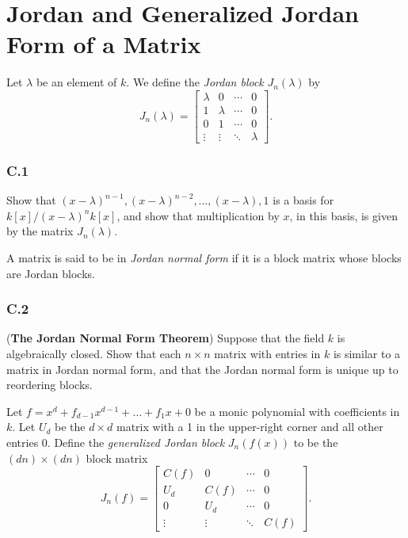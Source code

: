 \documentclass[lang=cn,11pt]{template}
\begin{document}
\chapter{Jordan and Generalized Jordan Form of a Matrix}

\begin{definition}
Let \( \lambda \) be an element of \( k \). We define the \textit{Jordan block} \( J_n(\lambda) \) by
\[
J_n(\lambda) = \begin{bmatrix}
\lambda & 0 & \cdots & 0 \\
1 & \lambda & \cdots & 0 \\
0 & 1 & \cdots & 0 \\
\vdots & \vdots & \ddots & \lambda
\end{bmatrix}.
\]
\end{definition}

\subsection*{C.1} Show that \( (x - \lambda)^{n-1}, (x - \lambda)^{n-2}, \dots, (x - \lambda), 1 \) is a basis for \( k[x] / (x - \lambda)^n k[x] \), and show that multiplication by \( x \), in this basis, is given by the matrix \( J_n(\lambda) \).

\begin{definition}
A matrix is said to be in \textit{Jordan normal form} if it is a block matrix whose blocks are Jordan blocks.
\end{definition}

\subsection*{C.2} (\textbf{The Jordan Normal Form Theorem}) Suppose that the field \( k \) is algebraically closed. Show that each \( n \times n \) matrix with entries in \( k \) is similar to a matrix in Jordan normal form, and that the Jordan normal form is unique up to reordering blocks.

\begin{definition}
Let \( f = x^d + f_{d-1} x^{d-1} + \dots + f_1 x + 0 \) be a monic polynomial with coefficients in \( k \). Let \( U_d \) be the \( d \times d \) matrix with a 1 in the upper-right corner and all other entries 0. Define the \textit{generalized Jordan block} \( J_n(f(x)) \) to be the \( (dn) \times (dn) \) block matrix
\[
J_n(f) = \begin{bmatrix}
C(f) & 0 & \cdots & 0 \\
U_d & C(f) & \cdots & 0 \\
0 & U_d & \cdots & 0 \\
\vdots & \vdots & \ddots & C(f)
\end{bmatrix}.
\]
\end{definition}
\end{document}

